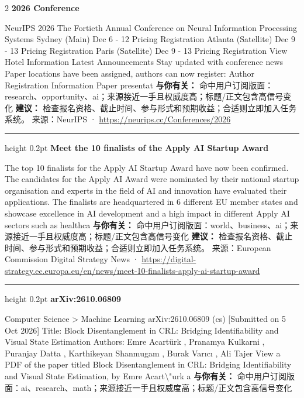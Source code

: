 \documentclass[10.5pt]{ctexart}
\begin{document}
\begin{multicols}{2}
{\large\bfseries 2026 Conference}\par
NeurIPS 2026 The Fortieth Annual Conference on Neural Information Processing Systems Sydney (Main) Dec 6 - 12 Pricing Registration Atlanta (Satellite) Dec 9 - 13 Pricing Registration Paris (Satellite) Dec 9 - 13 Pricing Registration View Hotel Information Latest Announcements Stay updated with conference news Paper locations have been assigned, authors can now register: Author Registration Information Paper presentat
\textbf{与你有关：} 命中用户订阅版面：research、opportunity、ai；来源接近一手且权威度高；标题/正文包含高信号变化
\textbf{建议：} 检查报名资格、截止时间、参与形式和预期收益；合适则立即加入任务系统。
{\footnotesize\color{ormuted} 来源：NeurIPS · \url{https://neurips.cc/Conferences/2026}}
\vspace{2mm}
\hrule height 0.2pt
\vspace{2mm}
{\large\bfseries Meet the 10 finalists of the Apply AI Startup Award}\par
The top 10 finalists for the Apply AI Startup Award have now been confirmed. The candidates for the Apply AI Award were nominated by their national startup organisation and experts in the field of AI and innovation have evaluated their applications. The finalists are headquartered in 6 different EU member states and showcase excellence in AI development and a high impact in different Apply AI sectors such as healthca
\textbf{与你有关：} 命中用户订阅版面：world、business、ai；来源接近一手且权威度高；标题/正文包含高信号变化
\textbf{建议：} 检查报名资格、截止时间、参与形式和预期收益；合适则立即加入任务系统。
{\footnotesize\color{ormuted} 来源：European Commission Digital Strategy News · \url{https://digital-strategy.ec.europa.eu/en/news/meet-10-finalists-apply-ai-startup-award}}
\vspace{2mm}
\hrule height 0.2pt
\vspace{2mm}
{\large\bfseries arXiv:2610.06809}\par
Computer Science > Machine Learning arXiv:2610.06809 (cs) [Submitted on 5 Oct 2026] Title: Block Disentanglement in CRL: Bridging Identifiability and Visual State Estimation Authors: Emre Acartürk , Pranamya Kulkarni , Puranjay Datta , Karthikeyan Shanmugam , Burak Varıcı , Ali Tajer View a PDF of the paper titled Block Disentanglement in CRL: Bridging Identifiability and Visual State Estimation, by Emre Acart\textbackslash{}"urk a
\textbf{与你有关：} 命中用户订阅版面：ai、research、math；来源接近一手且权威度高；标题/正文包含高信号变化

\end{multicols}
\end{document}
